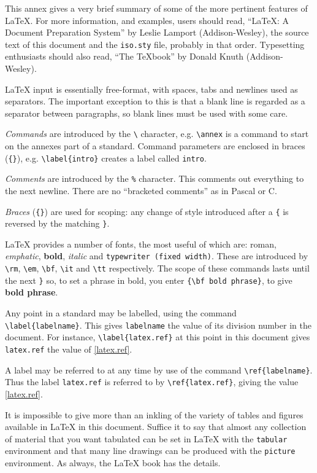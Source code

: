 This annex gives a very brief summary of some of the more pertinent features
of LaTeX.
For more information, and examples, users should read, ``LaTeX: A Document
Preparation System'' by Leslie Lamport (Addison-Wesley), the source text of
this document and the \verb|iso.sty| file, probably in that order.
Typesetting enthusiasts should also read, ``The TeXbook'' by Donald Knuth
(Addison-Wesley).

LaTeX input is essentially free-format, with spaces, tabs and newlines used
as separators.
The important exception to this is that a blank line is regarded as a
separator between paragraphs, so blank lines must be used with some care.

{\em Commands\/} are introduced by the \verb|\| character, e.g.
\verb|\annex| is a command to start on the annexes part of a standard.
Command parameters are enclosed in braces (\verb|{}|), e.g.
\verb|\label{intro}| creates a label called \verb|intro|.

{\em Comments\/} are introduced by the \verb|%| character.
This comments out everything to the next newline.
There are no ``bracketed comments'' as in Pascal or C.

{\em Braces\/} (\verb|{}|) are used for scoping: any change of style
introduced after a \verb|{| is reversed by the matching \verb|}|.

\label{guide.fonts}
LaTeX provides a number of fonts, the most useful of which are:
{\rm roman}, {\em emphatic}, {\bf bold}, {\it italic} and {\tt typewriter
(fixed width)}.
These are introduced by \verb|\rm|, \verb|\em|, \verb|\bf|, \verb|\it| and
\verb|\tt| respectively.
The scope of these commands lasts until the next \verb|}| so, to set a 
phrase in bold, you enter \verb|{\bf bold phrase}|, to give
{\bf bold phrase}.

Any point in a standard may be labelled, using the command
\verb|\label{labelname}|.
This gives \verb|labelname| the value of its division number in the document.
For instance, \verb|\label{latex.ref}| at this point in this document
\label{latex.ref} 
gives \verb|latex.ref| the value of \ref{latex.ref}.

A label may be referred to at any time by use of the command
\verb|\ref{labelname}|.
Thus the label \verb|latex.ref| is referred to by \verb|\ref{latex.ref}|,
giving the value \ref{latex.ref}.

It is impossible to give more than an inkling of the variety of tables and
figures available in LaTeX in this document.
Suffice it to say that almost any collection of material that you want
tabulated can be set in LaTeX with the \verb|tabular| environment and that
many line drawings can be produced with the \verb|picture| environment.
As always, the LaTeX book has the details.

